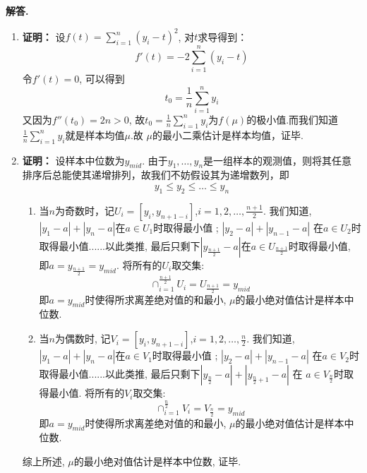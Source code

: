 \documentclass[12pt, a4paper, oneside]{ctexart}
\newenvironment{solution}{\par\noindent\textbf{解答. }}{\par}
\begin{document}
\begin{solution}
	
   	\begin{enumerate}
   	\item {\tt}    {\bf 证明：} 
   	设$f(t)=\sum_{i=1}^{n}(y_{i}-t)^2$, 对$t$求导得到：$$f'(t)=-2\sum_{i=1}^{n}(y_{i}-t)$$
   	令$f'(t)=0$, 可以得到
   	$$t_0=\frac{1}{n}\sum_{i=1}^{n}y_{i}$$
   	又因为$f''(t_0)=2n>0$, 故$t_0=\frac{1}{n}\sum_{i=1}^{n}y_{i}$为$f(\mu)$的极小值.而我们知道$\frac{1}{n}\sum_{i=1}^{n}y_{i}$就是样本均值$\mu$.故 $\mu$的最小二乘估计是样本均值，证毕.
   	
   	\item {\tt }   {\bf 证明：} 
   	设样本中位数为$y_{mid}$. 由于$y_{1},\dots,y_{n}$是一组样本的观测值，则将其任意排序后总能使其递增排列，故我们不妨假设其为递增数列，即
   	\[y_{1} \leq y_{2} \leq \dots \leq y_{n}\]
   		\begin{enumerate}
   	\item {\tt } 当$n$为奇数时，记$U_i=[y_i , y_{n+1-i}]$,$i=1,2,\dots, \frac{n+1}{2}$. 我们知道, $\left|y_1 - a \right|+\left|y_n - a \right| $在$ a\in U_1$时取得最小值 ; $\left|y_2 - a \right|+\left|y_{n-1} - a \right| $ 在$ a\in U_2$时取得最小值......以此类推, 最后只剩下$\left|y_{\frac{n+1}{2}} - a \right|$在$a\in U_{\frac{n+1}{2}}$时取得最小值, 即$a=y_{\frac{n+1}{2}}=y_{mid}$. 将所有的$U_i$取交集:
   	\[ \cap_{i=1}^{\frac{n+1}{2}}U_i=U_{\frac{n+1}{2}}=y_{mid} \]
   	即$a=y_{mid}$时使得所求离差绝对值的和最小, $\mu$的最小绝对值估计是样本中位数.
   	
   		\item {\tt } 当$n$为偶数时, 记$V_i=[y_i , y_{n+1-i}]$,$i=1,2,\dots, \frac{n}{2}$. 我们知道, $\left|y_1 - a \right|+\left|y_n - a \right| $在$ a\in V_1$时取得最小值 ; $\left|y_2 - a \right|+\left|y_{n-1} - a \right| $ 在$ a\in V_2$时取得最小值......以此类推, 最后只剩下$\left|y_{\frac{n}{2}} - a \right|+\left|y_{\frac{n}{2}+1} - a \right|$ 在 $a\in V_{\frac{n}{2}}$时取得最小值. 将所有的$V_i$取交集:
   		\[ \cap_{i=1}^{\frac{n}{2}}V_i=V_{\frac{n}{2}}=y_{mid} \]
   		即$a=y_{mid}$时使得所求离差绝对值的和最小, $\mu$的最小绝对值估计是样本中位数.
       \end{enumerate}
   综上所述,  $\mu$的最小绝对值估计是样本中位数, 证毕.
   	
   	
   	

\end{enumerate}
\end{solution}
\end{document}
